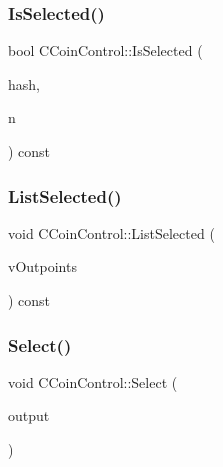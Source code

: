 \mbox{\label{class_c_coin_control_adcd674d510015f3212e489ab6bd74067}} 
\subsubsection{\texorpdfstring{Is\+Selected()}{IsSelected()}}
{\footnotesize\ttfamily bool C\+Coin\+Control\+::\+Is\+Selected (\begin{DoxyParamCaption}\item[{const \mbox{\hyperlink{classuint256}{uint256}} \&}]{hash,  }\item[{unsigned int}]{n }\end{DoxyParamCaption}) const\hspace{0.3cm}{\ttfamily [inline]}}

\mbox{\label{class_c_coin_control_ad2022117a10ff787973af3d7aa62df6f}} 
\subsubsection{\texorpdfstring{List\+Selected()}{ListSelected()}}
{\footnotesize\ttfamily void C\+Coin\+Control\+::\+List\+Selected (\begin{DoxyParamCaption}\item[{std\+::vector$<$ C\+Out\+Point $>$ \&}]{v\+Outpoints }\end{DoxyParamCaption}) const\hspace{0.3cm}{\ttfamily [inline]}}

\mbox{\label{class_c_coin_control_a7903e85623ba9b21583bd4018d17546c}} 
\subsubsection{\texorpdfstring{Select()}{Select()}}
{\footnotesize\ttfamily void C\+Coin\+Control\+::\+Select (\begin{DoxyParamCaption}\item[{const C\+Out\+Point \&}]{output }\end{DoxyParamCaption})\hspace{0.3cm}{\ttfamily [inline]}}

